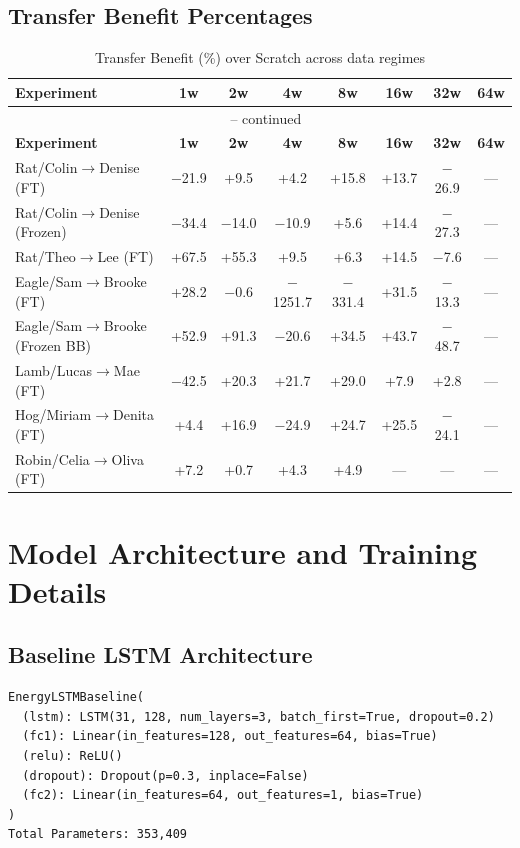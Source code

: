 \documentclass[12pt,a4paper]{report}
\begin{document}
\section{Transfer Benefit Percentages}

\begin{longtable}{lccccccc}
\caption{Transfer Benefit (\%) over Scratch across data regimes} \\
\toprule
\textbf{Experiment} & \textbf{1w} & \textbf{2w} & \textbf{4w} & \textbf{8w} & \textbf{16w} & \textbf{32w} & \textbf{64w} \\
\midrule
\endfirsthead
\multicolumn{8}{c}{{\tablename\ \thetable{} -- continued}} \\
\toprule
\textbf{Experiment} & \textbf{1w} & \textbf{2w} & \textbf{4w} & \textbf{8w} & \textbf{16w} & \textbf{32w} & \textbf{64w} \\
\midrule
\endhead
\bottomrule
\endlastfoot
Rat/Colin$\to$Denise (FT) & $-$21.9 & +9.5 & +4.2 & +15.8 & +13.7 & $-$26.9 & --- \\
Rat/Colin$\to$Denise (Frozen) & $-$34.4 & $-$14.0 & $-$10.9 & +5.6 & +14.4 & $-$27.3 & --- \\
Rat/Theo$\to$Lee (FT) & +67.5 & +55.3 & +9.5 & +6.3 & +14.5 & $-$7.6 & --- \\
Eagle/Sam$\to$Brooke (FT) & +28.2 & $-$0.6 & $-$1251.7 & $-$331.4 & +31.5 & $-$13.3 & --- \\
Eagle/Sam$\to$Brooke (Frozen BB) & +52.9 & +91.3 & $-$20.6 & +34.5 & +43.7 & $-$48.7 & --- \\
Lamb/Lucas$\to$Mae (FT) & $-$42.5 & +20.3 & +21.7 & +29.0 & +7.9 & +2.8 & --- \\
Hog/Miriam$\to$Denita (FT) & +4.4 & +16.9 & $-$24.9 & +24.7 & +25.5 & $-$24.1 & --- \\
Robin/Celia$\to$Oliva (FT) & +7.2 & +0.7 & +4.3 & +4.9 & --- & --- & --- \\
\end{longtable}

\chapter{Model Architecture and Training Details}

\section{Baseline LSTM Architecture}

\begin{verbatim}
EnergyLSTMBaseline(
  (lstm): LSTM(31, 128, num_layers=3, batch_first=True, dropout=0.2)
  (fc1): Linear(in_features=128, out_features=64, bias=True)
  (relu): ReLU()
  (dropout): Dropout(p=0.3, inplace=False)
  (fc2): Linear(in_features=64, out_features=1, bias=True)
)
Total Parameters: 353,409
\end{verbatim}
\end{document}
